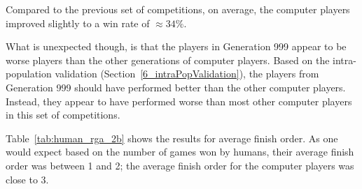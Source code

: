 Compared to the previous set of competitions, on average, the computer players
improved slightly to a win rate of \(\approx34\%\).

What is unexpected though, is that the players in Generation 999 appear to be
worse players than the other generations of computer players. Based on the
intra-population validation (Section~\ref{6_intraPopValidation}), the players
from Generation 999 should have performed better than the other computer
players. Instead, they appear to have performed worse than most other
computer players in this set of competitions.

Table~\ref{tab:human_rga_2b} shows the results for average finish order. As one
would expect based on the number of games won by humans, their average finish
order was between 1 and 2; the average finish order for the computer players was
close to 3.

